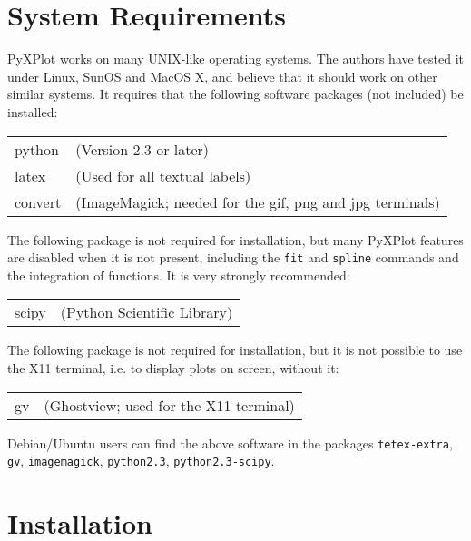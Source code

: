 \section{System Requirements}

PyXPlot works on many UNIX-like operating systems. The authors have tested it
under Linux, SunOS and MacOS X, and believe that it should work on other
similar systems. It requires that the following software packages (not
included) be installed:

\vspace{0.5cm}
\begin{tabular}{ll}
python  & (Version 2.3 or later) \\
latex   & (Used for all textual labels) \\
convert & (ImageMagick; needed for the gif, png and jpg terminals) \\
\end{tabular}
\vspace{0.5cm}

The following package is not required for installation, but many PyXPlot
features are disabled when it is not present, including the \texttt{fit} and
\texttt{spline} commands and the integration of functions. It is very strongly
recommended:

\vspace{0.5cm}
\begin{tabular}{ll} 
scipy   & (Python Scientific Library) \\
\end{tabular}
\vspace{0.5cm}

The following package is not required for installation, but it is not possible
to use the X11 terminal, i.e. to display plots on screen, without it:

\vspace{0.5cm}
\begin{tabular}{ll}
gv      & (Ghostview; used for the X11 terminal) \\
\end{tabular}
\vspace{0.5cm}

Debian/Ubuntu users can find the above software in the packages \texttt{tetex-extra},
\texttt{gv}, \texttt{imagemagick}, \texttt{python2.3},
\texttt{python2.3-scipy}.

\section{Installation}

